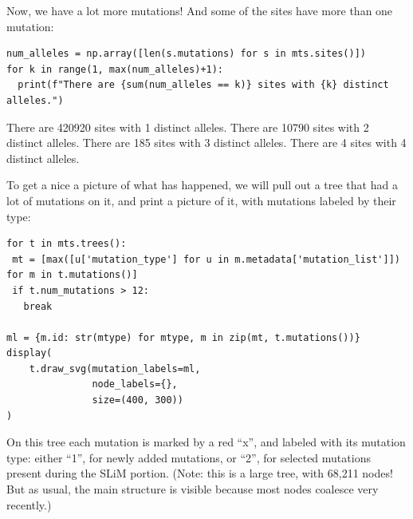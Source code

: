 \documentclass[12pt]{article}
\begin{document}
Now, we have a lot more mutations! And some of the sites have more than one mutation:

\begin{listing}[H]
    \begin{verbatim}
num_alleles = np.array([len(s.mutations) for s in mts.sites()])
for k in range(1, max(num_alleles)+1):
  print(f"There are {sum(num_alleles == k)} sites with {k} distinct alleles.")
    \end{verbatim}
\end{listing}
\begin{pycon}
There are 420920 sites with 1 distinct alleles.
There are 10790 sites with 2 distinct alleles.
There are 185 sites with 3 distinct alleles.
There are 4 sites with 4 distinct alleles.
\end{pycon}

To get a nice a picture of what has happened, we will pull out a tree that had a lot of mutations on it,
and print a picture of it, with mutations labeled by their type:

\begin{listing}[H]
    \begin{verbatim}
for t in mts.trees():
 mt = [max([u['mutation_type'] for u in m.metadata['mutation_list']]) for m in t.mutations()]
 if t.num_mutations > 12:
   break

ml = {m.id: str(mtype) for mtype, m in zip(mt, t.mutations())}
display(
    t.draw_svg(mutation_labels=ml,
               node_labels={},
               size=(400, 300))
)
    \end{verbatim}
\end{listing}


On this tree each mutation is marked by a red “x”,
and labeled with its mutation type: either “1”, for newly added mutations, or “2”, for selected mutations present during the SLiM portion.
(Note: this is a large tree, with 68,211 nodes! But as usual, the main structure is visible because most nodes coalesce very recently.) %
\end{document}
